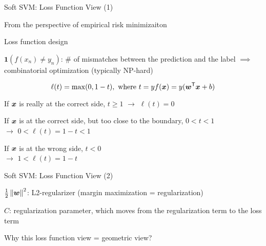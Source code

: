 \documentclass[handout,fleqn,aspectratio=169]{beamer}
\begin{document}
\begin{frame}{Soft SVM: Loss Function View (1)}

\plitemsep 0.07in
\bci

\item From the perspective of empirical risk minimizaiton

\item Loss function design
\bci
\item {} $\mathbf{1}(f(x_n) \neq y_n)$: \# of mismatches between the prediction and the label $\implies$ combinatorial optimization (typically NP-hard)

\item {}
$$
\ell(t) = \max(0,1-t), \ \text{where} \ t = y f(\vx) = y(\trans{\vw}\vx + b)
$$

{
\bci
\item If $\bm{x}$ is really at the correct side, $t \geq 1$ $\rightarrow$ $\ell(t) =0$
\item If $\bm{x}$ is at the correct side, but too close to the boundary, $0 < t < 1$ \\$\rightarrow$ $0< \ell(t) =1-t <1$
\item If $\bm{x}$ is at the wrong side, $ t < 0$ \\$\rightarrow$ $1 < \ell(t) =1-t$
\eci
}
{
}

\eci

\eci
\end{frame}

\begin{frame}{Soft SVM: Loss Function View (2)}

\plitemsep 0.1in
\bci

\item $\frac{1}{2}\left \lVert \bm{w} \right \rVert^2$: L2-regularizer (margin maximization = regularization)

\item $C$: regularization parameter, which moves from the regularization term to the loss term
\item Why this loss function view = geometric view?

\eci
\end{frame}
\end{document}
